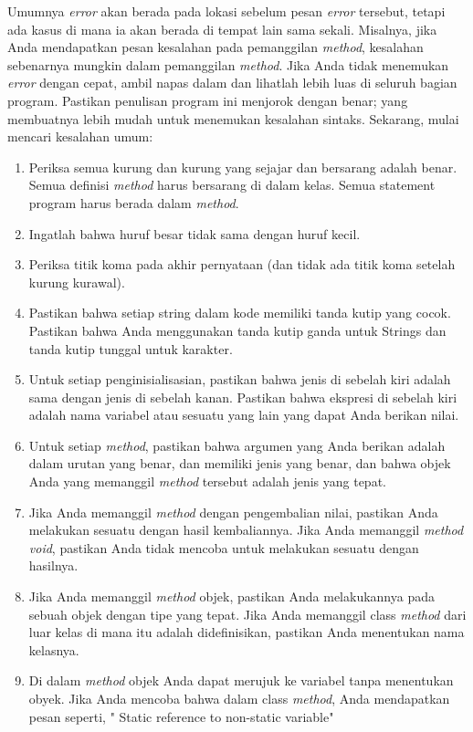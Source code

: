 \documentclass[12pt,b5paper,openright,twoside]{book}
\begin{document}
Umumnya \textit{error} akan berada pada lokasi sebelum pesan \textit{error} tersebut, tetapi ada kasus di mana ia akan berada di tempat lain sama sekali. Misalnya, jika Anda mendapatkan pesan kesalahan pada pemanggilan \textit{method}, kesalahan sebenarnya mungkin dalam pemanggilan \textit{method}.
Jika Anda tidak menemukan \textit{error} dengan cepat, ambil napas dalam dan lihatlah lebih luas di seluruh bagian program. Pastikan penulisan program ini menjorok dengan benar; yang membuatnya lebih mudah untuk menemukan kesalahan sintaks.
Sekarang, mulai mencari kesalahan umum:
\begin{enumerate}
    \item Periksa semua kurung dan kurung yang sejajar dan bersarang adalah benar. Semua definisi \textit{method} harus bersarang di dalam kelas. Semua statement program harus berada dalam \textit{method}.
    \item Ingatlah bahwa huruf besar tidak sama dengan huruf kecil.
    \item Periksa titik koma pada akhir pernyataan (dan tidak ada titik koma setelah kurung kurawal).
    \item Pastikan bahwa setiap string dalam kode memiliki tanda kutip yang cocok. Pastikan bahwa Anda menggunakan tanda kutip ganda untuk Strings dan tanda kutip tunggal untuk karakter.
    \item Untuk setiap penginisialisasian, pastikan bahwa jenis di sebelah kiri adalah sama dengan jenis di sebelah kanan. Pastikan bahwa ekspresi di sebelah kiri adalah nama variabel atau sesuatu yang lain yang dapat Anda berikan nilai.
    \item Untuk setiap \textit{method}, pastikan bahwa argumen yang Anda berikan adalah dalam urutan yang benar, dan memiliki jenis yang benar, dan bahwa objek Anda yang memanggil \textit{method} tersebut adalah jenis yang tepat.
    \item Jika Anda memanggil \textit{method} dengan pengembalian nilai, pastikan Anda melakukan sesuatu dengan hasil kembaliannya. Jika Anda memanggil \textit{method void}, pastikan Anda tidak mencoba untuk melakukan sesuatu dengan hasilnya.
    \item Jika Anda memanggil \textit{method} objek, pastikan Anda melakukannya pada sebuah objek dengan tipe yang tepat. Jika Anda memanggil class \textit{method} dari luar kelas di mana itu adalah didefinisikan, pastikan Anda menentukan nama kelasnya.
    \item Di dalam \textit{method} objek Anda dapat merujuk ke variabel tanpa menentukan obyek. Jika Anda mencoba bahwa dalam class \textit{method}, Anda mendapatkan pesan seperti, " Static reference to non-static variable" 
\end{enumerate}
\end{document}
